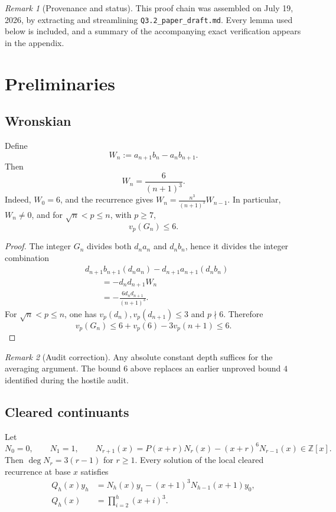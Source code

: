 \documentclass[11pt]{amsart}
\newcommand{\Z}{\mathbb{Z}}
\theoremstyle{plain}
\theoremstyle{remark}
\newtheorem{remark}{Remark}
\begin{document}
\begin{remark}[Provenance and status]
This proof chain was assembled on July 19, 2026, by extracting and
streamlining \texttt{Q3.2\_paper\_draft.md}.  Every lemma used below is
included, and a summary of the accompanying exact verification appears in
the appendix.
\end{remark}

\section{Preliminaries}

\subsection{Wronskian}

Define
\[
 W_n:=a_{n+1}b_n-a_nb_{n+1}.
\]
Then
\[
 W_n=\frac{6}{(n+1)^3}.
\]
Indeed, $W_0=6$, and the recurrence gives
$W_n=\frac{n^3}{(n+1)^3}W_{n-1}$.  In particular, $W_n\neq0$, and for
$\sqrt n<p\leq n$, with $p\geq7$,
\[
 v_p(G_n)\leq6.
\]

\begin{proof}
The integer $G_n$ divides both $d_na_n$ and $d_nb_n$, hence it divides the
integer combination
\begin{align*}
 &d_{n+1}b_{n+1}(d_na_n)
 -d_{n+1}a_{n+1}(d_nb_n)\\
 &\qquad=-d_nd_{n+1}W_n\\
 &\qquad=-\frac{6d_nd_{n+1}}{(n+1)^3}.
\end{align*}
For $\sqrt n<p\leq n$, one has
$v_p(d_n),v_p(d_{n+1})\leq3$ and $p\nmid6$.  Therefore
\[
 v_p(G_n)\leq6+v_p(6)-3v_p(n+1)\leq6.
\]
\end{proof}

\begin{remark}[Audit correction]
Any absolute constant depth suffices for the averaging argument.  The
bound $6$ above replaces an earlier unproved bound $4$ identified during
the hostile audit.
\end{remark}

\subsection{Cleared continuants}

Let
\[
 N_0=0,
 \qquad
 N_1=1,
 \qquad
 N_{r+1}(x)=P(x+r)N_r(x)-(x+r)^6N_{r-1}(x)\in\Z[x].
\]
Then $\deg N_r=3(r-1)$ for $r\geq1$.  Every solution of the local cleared recurrence
at base $x$ satisfies
\begin{equation}
 \begin{aligned}
 Q_h(x)y_h
 &=N_h(x)y_1-(x+1)^3N_{h-1}(x+1)y_0,\\
 Q_h(x)&=\prod_{i=2}^h(x+i)^3.
 \end{aligned}
 \tag{1.2}\label{eq:solution-formula}
\end{equation}
\end{document}

